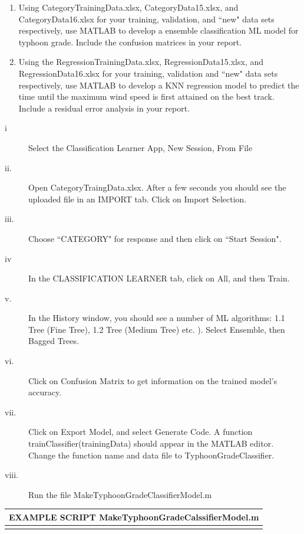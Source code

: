 \documentclass{SBCbookchapter}
\begin{document}
\begin{enumerate}
 \item Using CategoryTrainingData.xlsx,  CategoryData15.xlsx, and CategoryData16.xlsx for your training, validation, and ``new" data sets respectively, use MATLAB to develop a ensemble classification ML model for typhoon grade. Include the confusion matrices in your report. 
 	
 \item Using the RegressionTrainingData.xlsx, RegressionData15.xlsx, and RegressionData16.xlsx for your training, validation and ``new" data sets respectively, use MATLAB to develop  a KNN regression model to predict the time until the maximum wind speed is first attained on the best track. Include a residual error analysis in your report.
\end{enumerate}


\begin{description}
\item[i] Select the Classification Learner App, New Session, From File
\item[ii.] Open CategoryTraingData.xlsx. After a few seconds you should see the uploaded file in an IMPORT tab.  Click on Import Selection.
\item[iii.] Choose ``CATEGORY" for response and then click on ``Start Session".
\item[iv] In the CLASSIFICATION LEARNER tab, click on All, and then Train.
\item[v.] In the History window, you should see a number of ML algorithms: 1.1 Tree (Fine Tree), 1.2 Tree (Medium Tree) etc. ). Select Ensemble, then Bagged Trees.
\item[vi.]  Click on Confusion Matrix to get information on the trained model's accuracy.
\item[vii.] Click on Export Model, and select Generate Code.  A function trainClassifier(trainingData) should appear in the MATLAB editor.  Change the function name and data file to TyphoonGradeClassifier.
\item[viii.] Run the file MakeTyphoonGradeClassifierModel.m
  \end{description}


 \begin{table}[!htpb]
 \begin{tabular}{|l|}
\multicolumn{1}{l}{{EXAMPLE SCRIPT} {\tiny MakeTyphoonGradeCalssifierModel.m} }\\\hline
 \parbox[b]{2.75in}{}\\\hline
  \end{tabular}
 \end{table}
 
\end{document}
